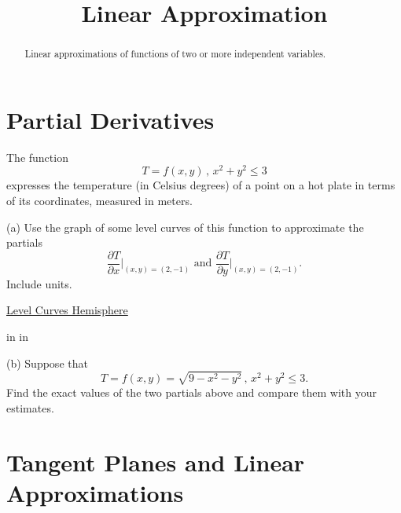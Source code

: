\documentclass{ximera}
\title{Linear Approximation}
\newcommand{\pskip}{\vskip 0.1 in}
\begin{document}
\begin{abstract}
Linear approximations of functions of two or more independent variables.
\end{abstract}
\maketitle


\section{Partial Derivatives}

\begin{example}  \label{Edgtr543}

The function
\[
    T = f(x,y) \, , \, x^2 + y^2 \leq 3
\]
expresses the temperature (in Celsius degrees) of a point on a hot plate in terms of its coordinates, measured in meters. 

(a) Use the graph of some level curves of this function to approximate the partials
\[
    \frac{\partial T}{\partial x}\Big|_{(x,y)=(2,-1)} \text{ and } \frac{\partial T}{\partial y}\Big|_{(x,y)=(2,-1)} .
\]
Include units.

 
\begin{onlineOnly}
    \begin{center}
\end{center}
\end{onlineOnly}

\href{https://www.desmos.com/calculator/et6f10fnti}{Level Curves Hemisphere}

\pskip \pskip

(b) Suppose that 
\[
    T = f(x,y) = \sqrt{9-x^2-y^2} \, , \, x^2 + y^2 \leq 3 .
\]
Find the exact values of the two partials above and compare them with your estimates.

\end{example}

\section{Tangent Planes and Linear Approximations}
\end{document}
